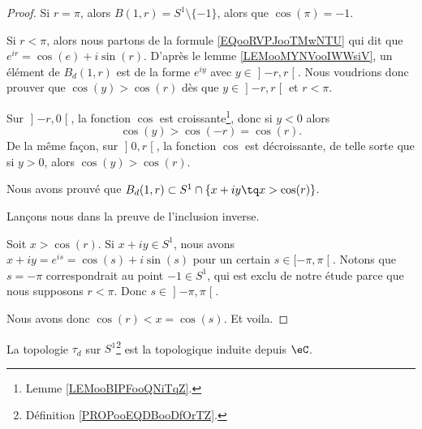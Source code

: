 \begin{proof}
    Si \( r=\pi\), alors \( B(1,r)=S^1\setminus\{ -1 \}\), alors que \( \cos(\pi)=-1\).

Si \( r<\pi\), alors nous partons de la formule \eqref{EQooRVPJooTMwNTU} qui dit que \(  e^{ir}=\cos(e)+i\sin(r)\). D'après le lemme \ref{LEMooMYNVooIWWsiV}, un élément de \( B_d(1,r)\) est de la forme \(  e^{iy}\) avec \( y\in \mathopen] -r , r \mathclose[\). Nous voudrions donc prouver que \( \cos(y)>\cos(r)\) dès que \( y\in\mathopen] -r , r \mathclose[\) et \( r<\pi\).

Sur \( \mathopen] -r , 0 \mathclose[\), la fonction \( \cos\) est croissante\footnote{Lemme \ref{LEMooBIPFooQNiTqZ}.}, donc si \( y<0\) alors 
    \begin{equation}
        \cos(y)>\cos(-r)=\cos(r).
    \end{equation}
De la même façon, sur \( \mathopen] 0,r \mathclose[\), la fonction \( \cos\) est décroissante, de telle sorte que si \( y>0\), alors \( \cos(y)>\cos(r)\).

    Nous avons prouvé que \( B_d(1,r)\subset S^1\cap  \{ x+iy\tq x>\cos(r) \}\). 

    Lançons nous dans la preuve de l'inclusion inverse.

    Soit \( x>\cos(r)\). Si \( x+iy\in S^1\), nous avons \( x+iy= e^{is}=\cos(s)+i\sin(s)\) pour un certain \( s\in\mathopen[ -\pi , \pi \mathclose[\). Notons que \( s=-\pi\) correspondrait au point \( -1\in S^1\), qui est exclu de notre étude parce que nous supposons \( r<\pi\). Donc \( s\in\mathopen] -\pi , \pi \mathclose[\).

    Nous avons donc \( \cos(r)<x=\cos(s)\). Et voila.
\end{proof}

\begin{proposition}
    La topologie \( \tau_d\) sur \( S^1\)\footnote{Définition \ref{PROPooEQDBooDfOrTZ}.} est la topologique induite depuis \( \eC\).
\end{proposition}

